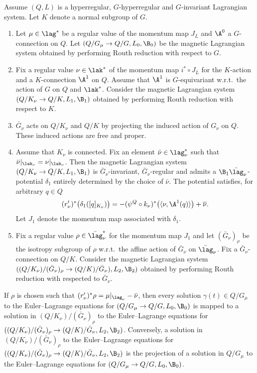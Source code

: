 \begin{theorem}\label{thm:routhstages}
Assume $(Q,L)$ is a hyperregular, $G$-hyperregular and $G$-invariant Lagrangian system. Let $K$ denote a normal subgroup of $G$.
\begin{enumerate}\itemsep=0pt
\item[$1.$]%
Let $\mu\in\lag^*$ be  a regular value of the momentum map $J_L$ and $\A^0$ a $G$-connection on $Q$. Let $(Q/G_\mu \to Q/G,  L_0, \B_0)$ be the magnetic Lagrangian system obtained by performing Routh reduction with respect to $G$.
\item[$2.$]%
Fix a regular value $\nu\in \lak^*$ of the momentum map $i^*\circ J_L$ for the $K$-action and a $K$-connection $\A^1$ on $Q$. Assume that $\A^1$ is $G$-equivariant w.r.t.\ the action of $G$ on $Q$ and $\lak^*$. Consider the magnetic Lagrangian system  $(Q/K_\nu \to Q/K,  L_{1},  \B_{1})$ obtained by performing Routh reduction with respect to $K$.

\item[$3.$]%
 $\bar G_\nu$ acts on $Q/K_\nu$ and $Q/K$ by projecting the induced action of $G_\nu$ on $Q$. These induced actions are free and proper.
\item[$4.$]%
Assume that $K_\nu$ is connected. Fix an element $\bar \nu\in \lag^*_\nu$ such that $\bar \nu |_{\lak_\nu} = \nu|_{\lak_\nu}$. Then the magnetic Lagrangian system  $(Q/K_\nu \to Q/K,  L_{1},  \B_{1})$ is $\bar G_\nu$-invariant, $\bar G_\nu$-regular and admits a $\B_1\bar\lag_\nu$-potential $\delta_1$ entirely determined by the choice of $\bar \nu$. The potential satisfies, for arbitrary $q\in Q$
\[
(r'_\nu)^*\big(\delta_1([q]_{K_\nu})\big)=  -(\psi^Q\circ k_\nu)^*\big(%
\langle \nu , \A^{1}(q)\rangle\big) + \overline\nu .
\] Let $J_1$ denote the momentum map associated with $\delta_1$.
\item[$5.$]%
Fix a regular value $\rho\in \bar\lag_\nu^*$ for the momentum map $J_{1}$ and let $(\bar G_{\nu})_\rho$ be the isotropy subgroup of $\rho$ w.r.t.\ the affine action of $\bar G_\nu$ on $\bar\lag_\nu$. Fix a $\bar G_\nu$-connection on $Q/K$. Consider the magnetic Lagrangian system $((Q/K_\nu)/(\bar G_\nu)_\rho \to (Q/K)/\bar G_\nu), L_{2}, \B_{2})$ obtained by performing Routh reduction with respected to $\bar{G}_\nu$.
\end{enumerate}
If $\rho$ is chosen such that $(r'_\nu)^*\rho = \mu|_{\lag_\nu} - \bar \nu$, then every solution $\gamma(t)\in Q/G_\mu$ to the Euler--Lagrange equations for $(Q/G_\mu\to Q/G, L_{0} , \B_{0})$ is mapped to a solution in $(Q/K_\nu)/(\bar G_\nu)_\rho$ to the Euler--Lagrange equations for $((Q/K_\nu)/(\bar G_\nu)_\rho \to (Q/K)/\bar G_\nu, L_{2}, \B_{2})$. Conversely, a solution in $(Q/K_\nu)/(\bar G_\nu)_\rho$ to  the Euler--Lagrange equations for $((Q/K_\nu)/(\bar G_\nu)_\rho \to (Q/K)/\bar G_\nu, L_{2}, \B_{2})$ is the projection of a solution in $Q/G_\mu$ to the Euler--Lagrange equations for $(Q/G_\mu\to Q/G, L_{0} , \B_{0})$.
\end{theorem}
